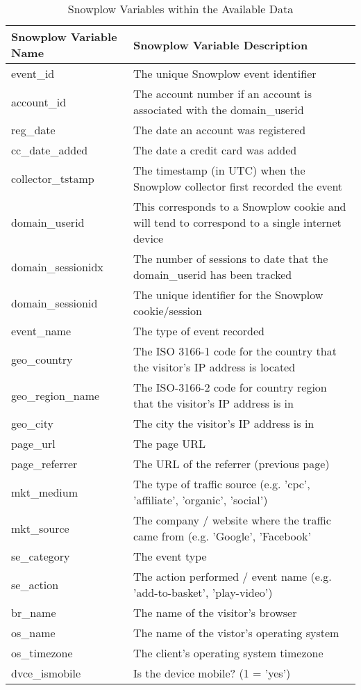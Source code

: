 \documentclass{article} %
\begin{document}
\begin{landscape}
\begin{table}[h!]
\centering
\begin{tabular}{| l | l |} 
\hline
Snowplow Variable Name  & Snowplow Variable Description  \\ [0.5ex] 
\hline\hline
event\_id   & The unique Snowplow event identifier \\
\hline
account\_id & The account number if an account is associated with the domain\_userid     \\ 
\hline
reg\_date & The date an account was registered  \\
\hline
cc\_date\_added & The date a credit card was added \\
\hline
collector\_tstamp & The timestamp (in UTC) when the Snowplow collector first recorded the event  \\
\hline
domain\_userid & This corresponds to a Snowplow cookie and will tend to correspond to a single internet device  \\ 
\hline
domain\_sessionidx & The number of sessions to date that the domain\_userid has been tracked \\
\hline
domain\_sessionid & The unique identifier for the Snowplow cookie/session \\
\hline
event\_name & The type of event recorded  \\
\hline
geo\_country & The ISO 3166-1 code for the country that the visitor's IP address is located \\
\hline
geo\_region\_name & The ISO-3166-2 code for country region that the visitor's IP address is in \\
\hline
geo\_city & The city the visitor's IP address is in  \\
\hline
page\_url & The page URL \\
\hline
page\_referrer & The URL of the referrer (previous page) \\
\hline
mkt\_medium & The type of traffic source (e.g. 'cpc', 'affiliate', 'organic', 'social')  \\
\hline
mkt\_source & The company / website where the traffic came from (e.g. 'Google', 'Facebook' \\
\hline
se\_category & The event type  \\ 
\hline                               
se\_action & The action performed / event name (e.g. 'add-to-basket', 'play-video') \\
\hline
br\_name   & The name of the visitor's browser       \\ 
\hline                               
os\_name     & The name of the vistor's operating system       \\   
\hline               
os\_timezone  & The client's operating system timezone       \\ 
\hline        
dvce\_ismobile  & Is the device mobile? (1 = 'yes')  \\
\hline
\end{tabular}
\caption{Snowplow Variables within the Available Data}
\label{table:1}
\end{table}
\end{landscape}
\end{document}

